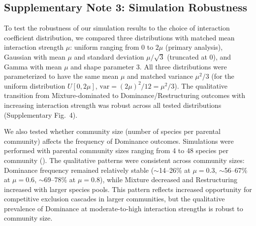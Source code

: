 \subsection*{Supplementary Note 3: Simulation Robustness}
\label{sec:suppl:note3}

To test the robustness of our simulation results to the choice of interaction coefficient distribution, we compared three distributions with matched mean interaction strength $\mu$: uniform ranging from 0 to $2\mu$ (primary analysis), Gaussian with mean $\mu$ and standard deviation $\mu/\sqrt{3}$ (truncated at 0), and Gamma with mean $\mu$ and shape parameter 3. All three distributions were parameterized to have the same mean $\mu$ and matched variance $\mu^2/3$ (for the uniform distribution $U[0, 2\mu]$, $\text{var} = (2\mu)^2/12 = \mu^2/3$). The qualitative transition from Mixture-dominated to Dominance/Restructuring outcomes with increasing interaction strength was robust across all tested distributions (Supplementary Fig.~4).

We also tested whether community size (number of species per parental community) affects the frequency of Dominance outcomes. Simulations were performed with parental community sizes ranging from 4 to 48 species per community (). The qualitative patterns were consistent across community sizes: Dominance frequency remained relatively stable ($\sim$14--26\% at $\mu=0.3$, $\sim$56--67\% at $\mu=0.6$, $\sim$69--78\% at $\mu=0.8$), while Mixture decreased and Restructuring increased with larger species pools. This pattern reflects increased opportunity for competitive exclusion cascades in larger communities, but the qualitative prevalence of Dominance at moderate-to-high interaction strengths is robust to community size.
